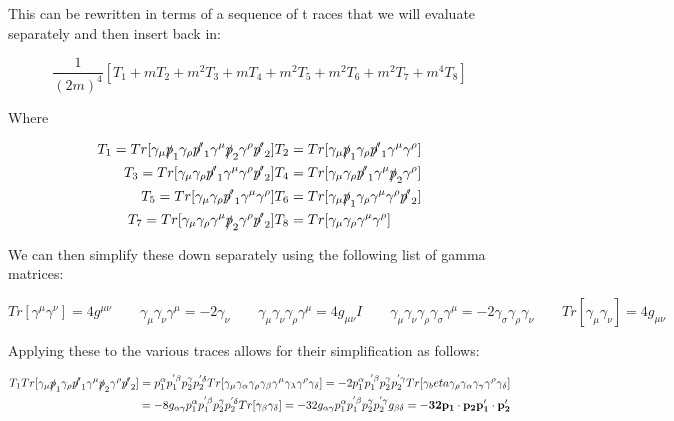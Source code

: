 \documentclass[a4]{article}
\begin{document}
    This can be rewritten in terms of a sequence of t races that we will evaluate separately and then insert back in:

    \begin{equation}
        \frac{1}{(2 m)^4} [T_1 + m T_2 + m^2 T_3 + m T_4 + m^2 T_5 + m^2 T_6 + m^2 T_7 + m^4 T_8]
    \end{equation}

    Where

    \begin{eqnarray}
        T_1 = Tr[ \gamma_\mu \slashed{p}_1 \gamma_\rho \slashed{p'}_1 \gamma^\mu \slashed{p}_2 \gamma^\rho \slashed{p'}_2] & T_2 = Tr[\gamma_\mu \slashed{p}_1 \gamma_\rho \slashed{p'}_1 \gamma^\mu \gamma^\rho] \\
        T_3 = Tr[\gamma_\mu \gamma_\rho \slashed{p'}_1 \gamma^\mu \gamma^\rho \slashed{p'}_2] & T_4 = Tr[\gamma_\mu \gamma_\rho \slashed{p'}_1 \gamma^\mu \slashed{p}_2 \gamma^\rho] \\
        T_5 = Tr[\gamma_\mu \gamma_\rho \slashed{p'}_1 \gamma^\mu \gamma^\rho] & T_6 = Tr[\gamma_\mu \slashed{p}_1 \gamma_\rho \gamma^\mu \gamma^\rho \slashed{p'}_2] \\
        T_7 = Tr[\gamma_\mu \gamma_\rho \gamma^\mu \slashed{p}_2 \gamma^\rho \slashed{p'}_2] & T_8 = Tr[\gamma_\mu \gamma_\rho \gamma^\mu \gamma^\rho] \\
    \end{eqnarray}

    We can then simplify these down separately using the following list of gamma matrices:

    \begin{equation}
        Tr [\gamma^\mu \gamma^\nu] = 4 g^{\mu \nu} \qquad \gamma_\mu \gamma_\nu \gamma^\mu = -2 \gamma_\nu \qquad \gamma_\mu \gamma_\nu \gamma_\rho \gamma^\mu = 4 g_{\mu \nu} I \qquad \gamma_\mu \gamma_\nu \gamma_\rho \gamma_\sigma \gamma^\mu = -2 \gamma_\sigma \gamma_\rho \gamma_\nu \qquad Tr[\gamma_\mu \gamma_\nu] = 4 g_{\mu \nu}
    \end{equation}

    Applying these to the various traces allows for their simplification as follows:

    \begin{eqnarray}
        T_1 Tr[ \gamma_\mu \slashed{p}_1 \gamma_\rho \slashed{p'}_1 \gamma^\mu \slashed{p}_2 \gamma^\rho \slashed{p'}_2] = p_1^\alpha p_1^{' \beta} p_2^\gamma p_2^{' \delta} Tr [\gamma_\mu \gamma_\alpha \gamma_\rho \gamma_\beta \gamma^\mu \gamma_\lambda \gamma^\rho \gamma_\delta] = -2 p_1^\alpha p_1^{' \beta} p_2^\gamma p_2^{' \gamma} Tr [\gamma_beta \gamma_\rho \gamma_\alpha \gamma_\gamma \gamma^\rho \gamma_\delta] \\
        = -8 g_{\alpha \gamma} p_1^\alpha p_1^{' \beta} p_2^\gamma p_2^{' \delta} Tr[\gamma_\beta \gamma_\delta] = -32 g_{\alpha \gamma} p_1^\alpha p_1^{' \beta} p_2^\gamma p_2^{' \gamma} g_{\beta \delta} = \mathbf{-32 p_1 \cdot p_2 p'_1 \cdot p'_2}
    \end{eqnarray}
\end{document}

